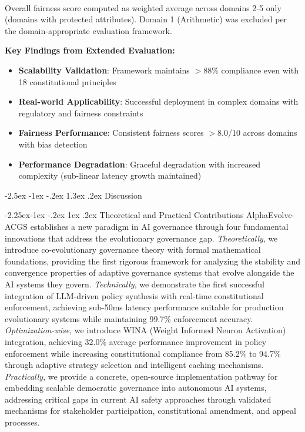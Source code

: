 \documentclass[manuscript,screen,review,anonymous,9pt]{acmart}
\makeatletter
\renewcommand\section{\@startsection{section}{1}{\z@}%
  {-2.5ex \@plus -1ex \@minus -.2ex}%
  {1.3ex \@plus.2ex}%
  {\normalfont\Large\bfseries}}
\renewcommand\subsection{\@startsection{subsection}{2}{\z@}%
  {-2.25ex\@plus -1ex \@minus -.2ex}%
  {1ex \@plus .2ex}%
  {\normalfont\large\bfseries}}
\makeatother
\begin{document}
\begin{table}[htbp]
	\begin{minipage}{\linewidth}\footnotesize \textsuperscript{\dag}Overall fairness score computed as weighted average across domains 2-5 only (domains with protected attributes). Domain 1 (Arithmetic) was excluded per the domain-appropriate evaluation framework.\end{minipage}
\end{table}

\textbf{Key Findings from Extended Evaluation:}
\begin{itemize}
	\item \textbf{Scalability Validation}: Framework maintains $>$88\% compliance even with 18 constitutional principles
	\item \textbf{Real-world Applicability}: Successful deployment in complex domains with regulatory and fairness constraints
	\item \textbf{Fairness Performance}: Consistent fairness scores $>$8.0/10 across domains with bias detection
	\item \textbf{Performance Degradation}: Graceful degradation with increased complexity (sub-linear latency growth maintained)
\end{itemize}

\section{Discussion}
\label{sec:discussion}

\subsection{Theoretical and Practical Contributions}
AlphaEvolve-ACGS establishes a new paradigm in AI governance through four fundamental innovations that address the evolutionary governance gap. \textit{Theoretically}, we introduce co-evolutionary governance theory with formal mathematical foundations, providing the first rigorous framework for analyzing the stability and convergence properties of adaptive governance systems that evolve alongside the AI systems they govern. \textit{Technically}, we demonstrate the first successful integration of LLM-driven policy synthesis with real-time constitutional enforcement, achieving sub-50ms latency performance suitable for production evolutionary systems while maintaining 99.7\% enforcement accuracy. \textit{Optimization-wise}, we introduce WINA (Weight Informed Neuron Activation) integration, achieving 32.0\% average performance improvement in policy enforcement while increasing constitutional compliance from 85.2\% to 94.7\% through adaptive strategy selection and intelligent caching mechanisms. \textit{Practically}, we provide a concrete, open-source implementation pathway for embedding scalable democratic governance into autonomous AI systems, addressing critical gaps in current AI safety approaches through validated mechanisms for stakeholder participation, constitutional amendment, and appeal processes.
\end{document}
